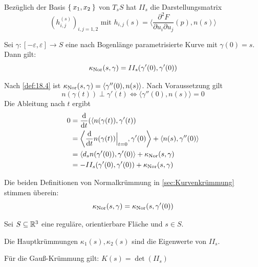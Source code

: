 \begin{bemerkung}%
    Bezüglich der Basis $\Set{x_1, x_2}$ von $T_s S$ hat $II_s$ die Darstellungsmatrix
    \[(h^{(s)}_{i,j})_{i,j=1,2} \text{ mit } h_{i,j}(s) = \langle \frac{\partial^2 F}{\partial u_i \partial u_j} (p), n(s) \rangle \]
\end{bemerkung}

\begin{proposition}\label{prop:19.6}%
    Sei $\gamma:[- \varepsilon, \varepsilon] \rightarrow S$ eine nach Bogenlänge
    parametrisierte Kurve mit $\gamma(0) = s$. Dann gilt:
    \[\kappa_{\textnormal{Nor}}(s, \gamma) = II_s(\gamma'(0), \gamma'(0))\]
\end{proposition}

\begin{beweis}
    Nach \cref{def:18.4} ist $\kappa_{\textnormal{Nor}}(s, \gamma) = \langle \gamma''(0), n(s) \rangle$.
    Nach Voraussetzung gilt
    \[n(\gamma(t)) \perp \gamma'(t) \Leftrightarrow \langle \gamma''(0), n(s) \rangle = 0\]
    Die Ableitung nach $t$ ergibt
    \begin{align*}
        0 &= \frac{\mathrm{d}}{\mathrm{d}t}(\langle n (\gamma(t)), \gamma'(t))\\
        &= \left \langle \frac{\mathrm{d}}{\mathrm{d}t} n(\gamma(t)) \Bigr |_{t=0}, \gamma'(0) \right \rangle + \langle n(s), \gamma''(0) \rangle\\
        &= \langle d_s n (\gamma'(0)), \gamma'(0) \rangle + \kappa_{\textnormal{Nor}}(s,\gamma)\\
        &= - II_s(\gamma'(0), \gamma'(0)) + \kappa_{\textnormal{Nor}}(s, \gamma)
    \end{align*}
\end{beweis}

\begin{folgerung}%
    Die beiden Definitionen von Normalkrümmung in \cref{sec:Kurvenkrümmung} stimmen
    überein:
    \[\kappa_{\textnormal{Nor}}(s, \gamma) = \kappa_{\textnormal{Nor}}(s, \gamma'(0))\]
\end{folgerung}

\begin{satz}%
    Sei $S \subseteq \mathbb{R}^3$ eine reguläre, orientierbare Fläche und $s \in S$.
    \begin{satzenum}
        \item Die Hauptkrümmungen $\kappa_1(s), \kappa_2(s)$ sind die Eigenwerte
              von $II_s$.
        \item Für die Gauß-Krümmung gilt: $K(s) = \det(II_s)$
    \end{satzenum}
\end{satz}

